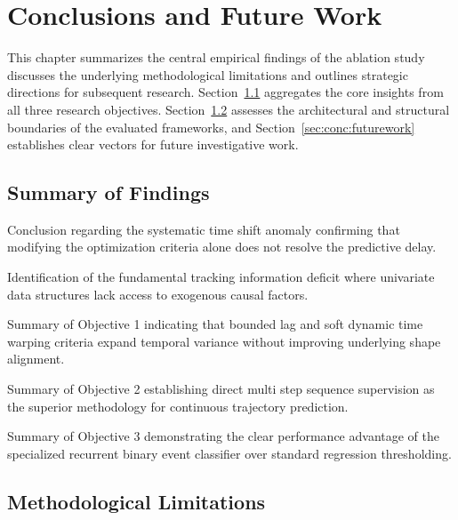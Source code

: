 \chapter{Conclusions and Future Work}
\label{ch:conclusions}

This chapter summarizes the central empirical findings of the ablation study discusses the underlying methodological limitations and outlines strategic directions for subsequent research. Section~\ref{sec:conc:summary} aggregates the core insights from all three research objectives. Section~\ref{sec:conc:limitations} assesses the architectural and structural boundaries of the evaluated frameworks, and Section~\ref{sec:conc:futurework} establishes clear vectors for future investigative work.

\section{Summary of Findings}
\label{sec:conc:summary}

\begin{planned}
    \item Conclusion regarding the systematic time shift anomaly confirming that modifying the optimization criteria alone does not resolve the predictive delay.
    \item Identification of the fundamental tracking information deficit where univariate data structures lack access to exogenous causal factors.
    \item Summary of Objective 1 indicating that bounded lag and soft dynamic time warping criteria expand temporal variance without improving underlying shape alignment.
    \item Summary of Objective 2 establishing direct multi step sequence supervision as the superior methodology for continuous trajectory prediction.
    \item Summary of Objective 3 demonstrating the clear performance advantage of the specialized recurrent binary event classifier over standard regression thresholding.
\end{planned}

\section{Methodological Limitations}
\label{sec:conc:limitations}

